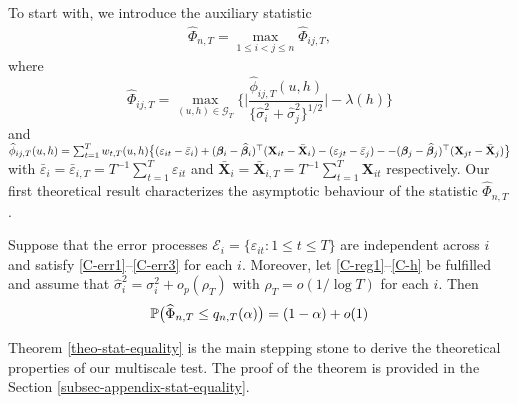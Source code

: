 \documentclass[a4paper,12pt]{article}
\begin{document}
To start with, we introduce the auxiliary statistic 
\begin{align}\label{Phi-hat-statistic}
\widehat{\Phi}_{n,T} = \max_{1 \le i < j \le n} \widehat{\Phi}_{ij,T},
\end{align}
where
\[ \widehat{\Phi}_{ij,T} = \max_{(u,h) \in \mathcal{G}_T} \Big\{ \Big| \frac{\widehat{\phi}_{ij,T}(u,h)} {\{ \widehat{\sigma}_i^2 + \widehat{\sigma}_j^2 \}^{1/2}} \Big| - \lambda(h) \Big \} \]
and $\widehat{\phi}_{ij,T}(u,h) = \sum_{t=1}^T w_{t,T}(u,h) \big\{ (\varepsilon_{it} - \bar{\varepsilon}_i) + (\bm{\beta}_i - \widehat{\bm{\beta}}_i)^\top (\mathbf{X}_{it} - \bar{\mathbf{X}}_{i}) - (\varepsilon_{jt} - \bar{\varepsilon}_j) - \linebreak - (\bm{\beta}_j - \widehat{\bm{\beta}}_j)^\top (\mathbf{X}_{jt} - \bar{\mathbf{X}}_{j}) \big\}$ with $\bar{\varepsilon}_i = \bar{\varepsilon}_{i,T} = T^{-1} \sum_{t=1}^T \varepsilon_{it}$ and $ \bar{\mathbf{X}}_{i} =  \bar{\mathbf{X}}_{i, T} = T^{-1}\sum_{t=1}^T  \mathbf{X}_{it}$ respectively. Our first theoretical result characterizes the asymptotic behaviour of the statistic $\widehat{\Phi}_{n,T}$. 
\begin{theorem}\label{theo-stat-equality}
Suppose that the error processes $\mathcal{E}_i = \{ \varepsilon_{it}: 1 \le t \le T \}$ are independent across $i$ and satisfy \ref{C-err1}--\ref{C-err3} for each $i$. Moreover, let \ref{C-reg1}--\ref{C-h} be fulfilled and assume that $\widehat{\sigma}_i^2 = \sigma_i^2 + o_p(\rho_T)$ with $\rho_T = o(1/\log T)$ for each $i$. Then 
\[ \mathbb{P} \big( \widehat{\Phi}_{n,T} \le q_{n,T}(\alpha) \big) = (1 - \alpha) + o(1) \]
\end{theorem}
Theorem \ref{theo-stat-equality} is the main stepping stone to derive the theoretical properties of our multiscale test. The proof of the theorem is provided in the Section \ref{subsec-appendix-stat-equality}.
\end{document}
